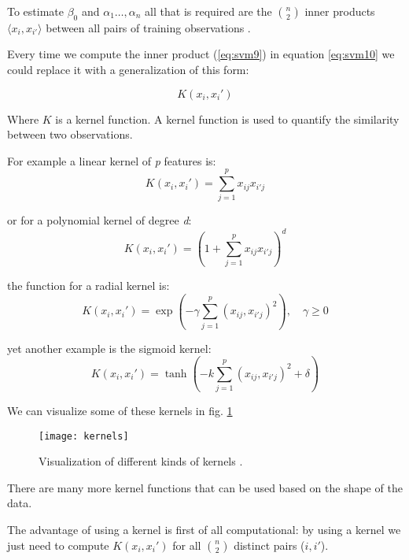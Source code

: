 To estimate $\beta_{0}$ and $\alpha_1 \dots, \alpha_n$ all that is required are the $n \choose 2$ inner products $\langle x_i, x_{i'} \rangle$ between all pairs of training observations \cite{ISLR}.

Every time we compute the inner product (\ref{eq:svm9}) in equation \ref{eq:svm10} we could replace it with a generalization of this form:

\begin{equation} \label{eq:svm11}
K(x_i, x_i')
\end{equation}

Where $K$ is a kernel function. A kernel function is used to quantify the similarity between two observations. 

For example a linear kernel of \textit{p} features is:
\begin{equation} \label{eq:svm12}
	K(x_i, x_i') = \sum_{j=1}^{p} x_{ij}x_{i'j}
\end{equation}

or for a polynomial kernel of degree \textit{d}:
\begin{equation} \label{eq:svm13}
	K(x_i, x_i') = (1 + \sum_{j=1}^{p} x_{ij}x_{i'j})^d
\end{equation}

the function for a radial kernel is:
\begin{equation} \label{eq:svm14}
	K(x_i, x_i') = \exp(-\gamma\sum_{j=1}^{p} (x_{ij}, x_{i'j})^2), \quad \gamma \ge 0
\end{equation} 

yet another example is the sigmoid kernel:
\begin{equation} \label{eq:svm15}
	K(x_i, x_i') = \tanh(-k\sum_{j=1}^{p} (x_{ij}, x_{i'j})^2 + \delta)
\end{equation}


We can visualize some of these kernels in fig. \ref{fig:kernels}
\begin{figure}[H]
	\centering
	\texttt{[image: kernels]}
	\caption{Visualization of different kinds of kernels \cite{kernels}.}
	\label{fig:kernels}
\end{figure} 

There are many more kernel functions that can be used based on the shape of the data.

The advantage of using a kernel is first of all computational: by using a kernel we just need to compute $K(x_i, x_i')$ for all $n \choose 2$ distinct pairs ($i, i'$).

